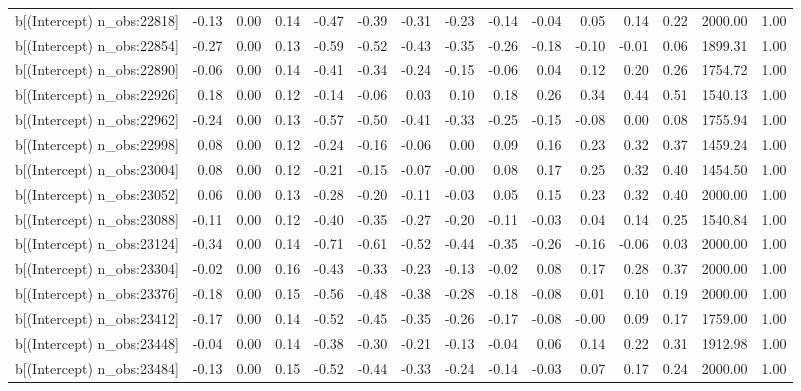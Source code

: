 \begin{table}[ht]
\begin{tabular}{rrrrrrrrrrrrrrr}
  b[(Intercept) n\_obs:22818] & -0.13 & 0.00 & 0.14 & -0.47 & -0.39 & -0.31 & -0.23 & -0.14 & -0.04 & 0.05 & 0.14 & 0.22 & 2000.00 & 1.00 \\ 
  b[(Intercept) n\_obs:22854] & -0.27 & 0.00 & 0.13 & -0.59 & -0.52 & -0.43 & -0.35 & -0.26 & -0.18 & -0.10 & -0.01 & 0.06 & 1899.31 & 1.00 \\ 
  b[(Intercept) n\_obs:22890] & -0.06 & 0.00 & 0.14 & -0.41 & -0.34 & -0.24 & -0.15 & -0.06 & 0.04 & 0.12 & 0.20 & 0.26 & 1754.72 & 1.00 \\ 
  b[(Intercept) n\_obs:22926] & 0.18 & 0.00 & 0.12 & -0.14 & -0.06 & 0.03 & 0.10 & 0.18 & 0.26 & 0.34 & 0.44 & 0.51 & 1540.13 & 1.00 \\ 
  b[(Intercept) n\_obs:22962] & -0.24 & 0.00 & 0.13 & -0.57 & -0.50 & -0.41 & -0.33 & -0.25 & -0.15 & -0.08 & 0.00 & 0.08 & 1755.94 & 1.00 \\ 
  b[(Intercept) n\_obs:22998] & 0.08 & 0.00 & 0.12 & -0.24 & -0.16 & -0.06 & 0.00 & 0.09 & 0.16 & 0.23 & 0.32 & 0.37 & 1459.24 & 1.00 \\ 
  b[(Intercept) n\_obs:23004] & 0.08 & 0.00 & 0.12 & -0.21 & -0.15 & -0.07 & -0.00 & 0.08 & 0.17 & 0.25 & 0.32 & 0.40 & 1454.50 & 1.00 \\ 
  b[(Intercept) n\_obs:23052] & 0.06 & 0.00 & 0.13 & -0.28 & -0.20 & -0.11 & -0.03 & 0.05 & 0.15 & 0.23 & 0.32 & 0.40 & 2000.00 & 1.00 \\ 
  b[(Intercept) n\_obs:23088] & -0.11 & 0.00 & 0.12 & -0.40 & -0.35 & -0.27 & -0.20 & -0.11 & -0.03 & 0.04 & 0.14 & 0.25 & 1540.84 & 1.00 \\ 
  b[(Intercept) n\_obs:23124] & -0.34 & 0.00 & 0.14 & -0.71 & -0.61 & -0.52 & -0.44 & -0.35 & -0.26 & -0.16 & -0.06 & 0.03 & 2000.00 & 1.00 \\ 
  b[(Intercept) n\_obs:23304] & -0.02 & 0.00 & 0.16 & -0.43 & -0.33 & -0.23 & -0.13 & -0.02 & 0.08 & 0.17 & 0.28 & 0.37 & 2000.00 & 1.00 \\ 
  b[(Intercept) n\_obs:23376] & -0.18 & 0.00 & 0.15 & -0.56 & -0.48 & -0.38 & -0.28 & -0.18 & -0.08 & 0.01 & 0.10 & 0.19 & 2000.00 & 1.00 \\ 
  b[(Intercept) n\_obs:23412] & -0.17 & 0.00 & 0.14 & -0.52 & -0.45 & -0.35 & -0.26 & -0.17 & -0.08 & -0.00 & 0.09 & 0.17 & 1759.00 & 1.00 \\ 
  b[(Intercept) n\_obs:23448] & -0.04 & 0.00 & 0.14 & -0.38 & -0.30 & -0.21 & -0.13 & -0.04 & 0.06 & 0.14 & 0.22 & 0.31 & 1912.98 & 1.00 \\ 
  b[(Intercept) n\_obs:23484] & -0.13 & 0.00 & 0.15 & -0.52 & -0.44 & -0.33 & -0.24 & -0.14 & -0.03 & 0.07 & 0.17 & 0.24 & 2000.00 & 1.00 \\ 

\end{tabular}
\end{table}
